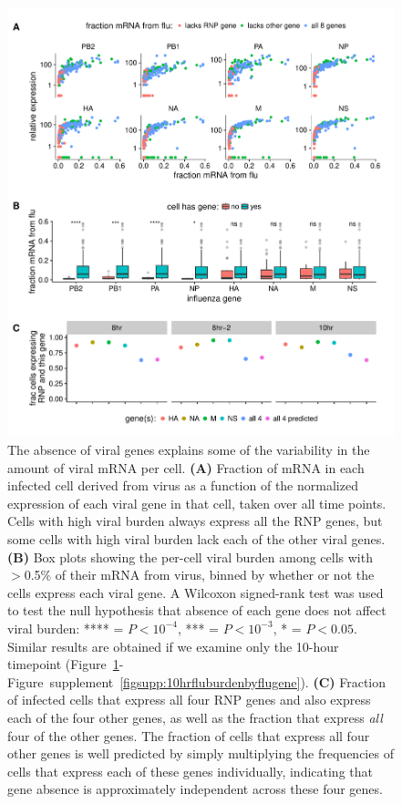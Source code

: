 \documentclass[9pt,lineno]{elife}
\begin{document}
\begin{figure}[t!]
\centerline{\includegraphics[width=0.9\linewidth]{figures/p_flu_burden_flu_gene_merge.pdf}}
\caption{\label{fig:fluburdenbyflugene}
The absence of viral genes explains some of the variability in the amount of viral mRNA per cell.
{\bf (A)} 
Fraction of mRNA in each infected cell derived from virus as a function of the normalized expression of each viral gene in that cell, taken over all time points.
Cells with high viral burden always express all the RNP genes, but some cells with high viral burden lack each of the other viral genes.
{\bf (B)}
Box plots showing the per-cell viral burden among cells with $>$0.5\% of their mRNA from virus, binned by whether or not the cells express each viral gene.
A Wilcoxon signed-rank test was used to test the null hypothesis that absence of each gene does not affect viral burden: **** = $P < 10^{-4}$, *** = $P < 10^{-3}$,  * = $P < 0.05$.
Similar results are obtained if we examine only the 10-hour timepoint (Figure~\ref{fig:fluburdenbyflugene}-Figure~supplement~\ref{figsupp:10hrfluburdenbyflugene}).
{\bf (C)}
Fraction of infected cells that express all four RNP genes and also express each of the four other genes, as well as the fraction that express \emph{all} four of the other genes.
The fraction of cells that express all four other genes is well predicted by simply multiplying the frequencies of cells that express each of these genes individually, indicating that gene absence is approximately independent across these four genes.
}
\end{figure}
\end{document}
